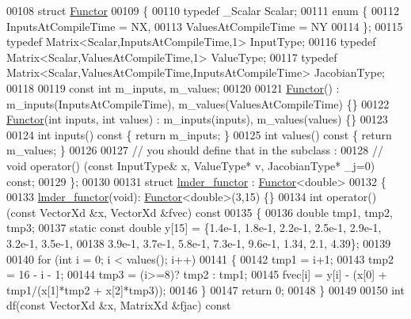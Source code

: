 \begin{DoxyCode}
00108 \textcolor{keyword}{struct }\hyperlink{struct_functor}{Functor}
00109 \{
00110   \textcolor{keyword}{typedef} \_Scalar Scalar;
00111   \textcolor{keyword}{enum} \{
00112     InputsAtCompileTime = NX,
00113     ValuesAtCompileTime = NY
00114   \};
00115   \textcolor{keyword}{typedef} Matrix<Scalar,InputsAtCompileTime,1> InputType;
00116   \textcolor{keyword}{typedef} Matrix<Scalar,ValuesAtCompileTime,1> ValueType;
00117   \textcolor{keyword}{typedef} Matrix<Scalar,ValuesAtCompileTime,InputsAtCompileTime> JacobianType;
00118 
00119   \textcolor{keyword}{const} \textcolor{keywordtype}{int} m\_inputs, m\_values;
00120 
00121   \hyperlink{struct_functor}{Functor}() : m\_inputs(InputsAtCompileTime), m\_values(ValuesAtCompileTime) \{\}
00122   \hyperlink{struct_functor}{Functor}(\textcolor{keywordtype}{int} inputs, \textcolor{keywordtype}{int} values) : m\_inputs(inputs), m\_values(values) \{\}
00123 
00124   \textcolor{keywordtype}{int} inputs()\textcolor{keyword}{ const }\{ \textcolor{keywordflow}{return} m\_inputs; \}
00125   \textcolor{keywordtype}{int} values()\textcolor{keyword}{ const }\{ \textcolor{keywordflow}{return} m\_values; \}
00126 
00127   \textcolor{comment}{// you should define that in the subclass :}
00128 \textcolor{comment}{//  void operator() (const InputType& x, ValueType* v, JacobianType* \_j=0) const;}
00129 \};
00130 
00131 \textcolor{keyword}{struct }\hyperlink{structlmder__functor}{lmder\_functor} : \hyperlink{struct_functor}{Functor}<double>
00132 \{
00133     \hyperlink{structlmder__functor}{lmder\_functor}(\textcolor{keywordtype}{void}): \hyperlink{struct_functor}{Functor}<double>(3,15) \{\}
00134     \textcolor{keywordtype}{int} operator()(\textcolor{keyword}{const} VectorXd &x, VectorXd &fvec)\textcolor{keyword}{ const}
00135 \textcolor{keyword}{    }\{
00136         \textcolor{keywordtype}{double} tmp1, tmp2, tmp3;
00137         \textcolor{keyword}{static} \textcolor{keyword}{const} \textcolor{keywordtype}{double} y[15] = \{1.4e-1, 1.8e-1, 2.2e-1, 2.5e-1, 2.9e-1, 3.2e-1, 3.5e-1,
00138             3.9e-1, 3.7e-1, 5.8e-1, 7.3e-1, 9.6e-1, 1.34, 2.1, 4.39\};
00139 
00140         \textcolor{keywordflow}{for} (\textcolor{keywordtype}{int} i = 0; i < values(); i++)
00141         \{
00142             tmp1 = i+1;
00143             tmp2 = 16 - i - 1;
00144             tmp3 = (i>=8)? tmp2 : tmp1;
00145             fvec[i] = y[i] - (x[0] + tmp1/(x[1]*tmp2 + x[2]*tmp3));
00146         \}
00147         \textcolor{keywordflow}{return} 0;
00148     \}
00149 
00150     \textcolor{keywordtype}{int} df(\textcolor{keyword}{const} VectorXd &x, MatrixXd &fjac)\textcolor{keyword}{ const}

\end{DoxyCode}
